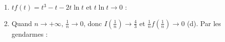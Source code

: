 \begin{description}
\begin{enumerate}
\begin{enumerate}
			\item {}
				$t f(t) = t^3 - t - 2t\ln t$ et $t\ln t \to 0$ : \par\noindent{}
			\item {}
				Quand $n \to +\infty$, $\frac{1}{n} \to 0$, donc $I\left(\frac{1}{n}\right) \to \frac{4}{3}$ et $\frac{1}{n}f\left(\frac{1}{n}\right) \to 0$ (d). Par les gendarmes :
				\par\noindent{}
		\end{enumerate}
	\end{enumerate}
\end{description}
